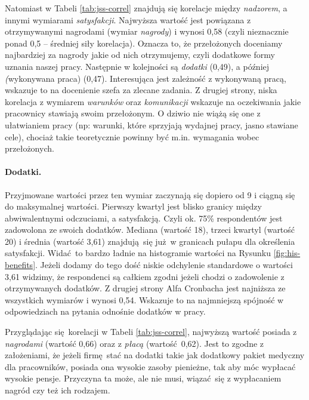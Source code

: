 Natomiast w Tabeli \ref{tab:jss-correl} znajdują się korelacje między \textit{nadzorem}, a innymi wymiarami \textit{satysfakcji}. Najwyższa wartość jest powiązana z otrzymywanymi nagrodami (wymiar \textit{nagrody}) i wynosi 0,58 (czyli nieznacznie ponad 0,5 -- średniej siły korelacja). Oznacza to, że przełożonych doceniamy najbardziej za nagrody jakie od nich otrzymujemy, czyli dodatkowe formy uznania naszej pracy. Następnie w kolejności są \textit{dodatki} (0,49), a
później \textit(wykonywana praca) (0,47). Interesująca jest zależność z wykonywaną pracą, wskazuje to na docenienie szefa za zlecane zadania. Z drugiej strony, niska korelacja z wymiarem \textit{warunków} oraz \textit{komunikacji} wskazuje na oczekiwania jakie pracownicy stawiają swoim przełożonym. O dziwio nie wiążą się one z ułatwianiem pracy (np: warunki, które sprzyjają wydajnej pracy, jasno stawiane cele), chociaż takie teoretycznie powinny być m.in. wymagania wobec przełożonych.

\paragraph{Dodatki.}\label{par:res-benefits} Przyjmowane wartości przez ten wymiar zaczynają się dopiero od 9 i ciągną się do maksymalnej wartości. Pierwszy kwartyl jest blisko granicy między abwiwalentnymi odczuciami, a satysfakcją. Czyli ok. 75\% respondentów jest zadowolona ze swoich dodatków. Mediana (wartość 18), trzeci kwartyl (wartość 20) i średnia (wartość 3,61) znajdują się już w granicach pułapu dla określenia satysfakcji. Widać to bardzo ładnie na histogramie wartości na
Rysunku \ref{fig:his-benefits}. Jeżeli dodamy do tego dość niskie
odchylenie standardowe o wartości 3,61 widzimy, że respondenci są całkiem zgodni jeżeli chodzi o zadowolenie z otrzymywanych dodatków. Z drugiej strony Alfa Cronbacha jest najniższa ze wszystkich wymiarów i wynosi 0,54. Wskazuje to na najmniejszą spójność w odpowiedziach na pytania odnośnie dodatków w pracy.

Przyglądając się korelacji w Tabeli \ref{tab:jss-correl}, najwyższą wartość posiada z \textit{nagrodami} (wartość 0,66) oraz z \textit{płacą} (wartość 0,62). Jest to zgodne z założeniami, że jeżeli firmę stać na dodatki takie jak dodatkowy pakiet medyczny dla pracowników, posiada ona wysokie zasoby pienieżne, tak aby móc wypłacać wysokie pensje. Przyczyna ta może, ale nie musi, wiązać się z wypłacaniem nagród czy też ich rodzajem. 

